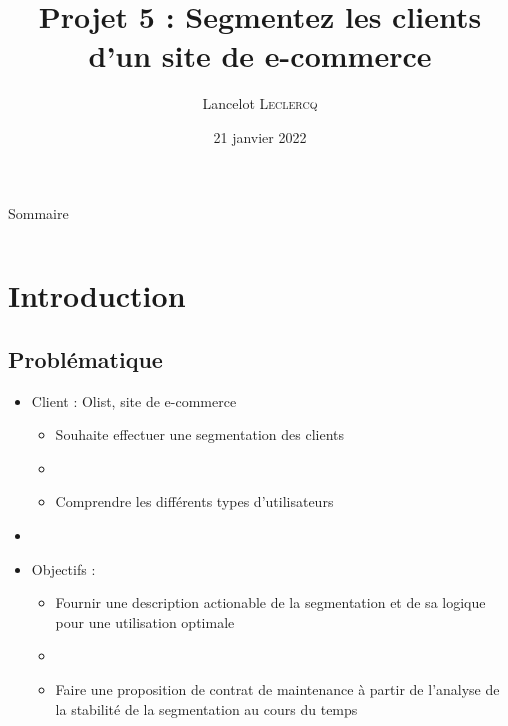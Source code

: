 \documentclass[8pt,aspectratio=169,hyperref={unicode=true}]{beamer}
\title[Segmentez les clients d'un site de e-commerce]
{Projet 5 : Segmentez les clients d'un site de e-commerce}
\author[Lancelot \textsc{Leclercq}]{Lancelot \textsc{Leclercq}}
\institute[]{}
\date[]{\small{21 janvier 2022}}
\begin{document}
\begin{frame}[plain]
    \titlepage
\end{frame}

\begin{frame}{Sommaire}
    \Large
    \begin{columns}
        \begin{column}{.7\textwidth}
            \tableofcontents[hideallsubsections]
        \end{column}
    \end{columns}
\end{frame}


\section{Introduction}
\subsection{Problématique}
\begin{frame}{\insertsubsection}
    \begin{itemize}
        \item Client : Olist, site de e-commerce
              \begin{itemize}
                  \item Souhaite effectuer une segmentation des clients
                  \item[]
                  \item Comprendre les différents types d'utilisateurs
              \end{itemize}
        \item[]
        \item Objectifs :
              \begin{itemize}
                  \item Fournir une description actionable de la segmentation et de sa logique pour une utilisation optimale
                  \item[]
                  \item Faire une proposition de contrat de maintenance à partir de l'analyse de la stabilité de la segmentation au cours du temps
              \end{itemize}
    \end{itemize}
\end{frame}
\end{document}
